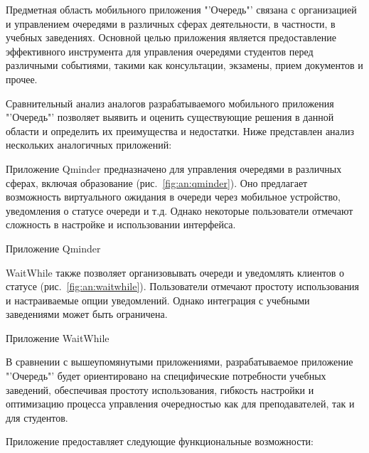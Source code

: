 

Предметная область мобильного приложения "'Очередь"' связана с организацией
и управлением очередями в различных сферах деятельности, в частности,
в учебных заведениях. Основной целью приложения является предоставление
эффективного инструмента для управления очередями студентов перед различными
событиями, такими как консультации, экзамены, прием документов и прочее.

Сравнительный анализ аналогов разрабатываемого мобильного приложения "'Очередь"'
позволяет выявить и оценить существующие решения в данной области
и определить их преимущества и недостатки.
Ниже представлен анализ нескольких аналогичных приложений:

 Приложение Qminder предназначено
для управления очередями в различных сферах,
включая образование (рис.~\ref{fig:an:qminder}).
Оно предлагает возможность виртуального ожидания
в очереди через мобильное устройство,
уведомления о статусе очереди и т.д.
Однако некоторые пользователи отмечают сложность в настройке
и использовании интерфейса.

\begin{image}
	\caption{Приложение Qminder}
	\label{fig:an:qminder}
\end{image}

 WaitWhile также позволяет организовывать
очереди и уведомлять клиентов о статусе (рис.~\ref{fig:an:waitwhile}).
Пользователи отмечают простоту использования
и настраиваемые опции уведомлений.
Однако интеграция с учебными заведениями может быть ограничена.

\begin{image}
	\caption{Приложение WaitWhile}
	\label{fig:an:waitwhile}
\end{image}

В сравнении с вышеупомянутыми приложениями,
разрабатываемое приложение "'Очередь"' будет ориентировано
на специфические потребности учебных заведений,
обеспечивая простоту использования, гибкость настройки
и оптимизацию процесса управления очередностью как для преподавателей,
так и для студентов.\par
Приложение предоставляет следующие функциональные возможности:

